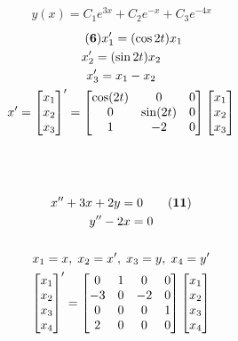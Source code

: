\documentclass{article}
\begin{document}
    \begin{gather*}
        y(x) = C_1e^{3x}+C_2e^{-x}+C_3e^{-4x}
    \end{gather*}
    \begin{gather*}\tag{\textbf{6}}
        x'_1 = (\cos2t)x_1\\
        x'_2 = (\sin2t)x_2\\
        x'_3 = x_1-x_2\\
        x' =
        \begin{bmatrix}
            x_1\\x_2\\x_3
        \end{bmatrix}'
        = 
        \begin{bmatrix}
            \cos(2t) & 0 & 0\\
            0 & \sin(2t) & 0\\
            1 & -2 & 0
        \end{bmatrix}
        \begin{bmatrix}
            x_1 \\ x_2 \\ x_3
        \end{bmatrix}
        \\\\\\\\
        x'' + 3x + 2y = 0 \tag{\textbf{11}}\\
        y'' - 2x = 0\\\\
        x_1 = x,\;x_2 = x',\;x_3 = y,\;x_4 = y'\\
        \begin{bmatrix}
            x_1\\x_2\\x_3\\x_4
        \end{bmatrix}'
        =
        \begin{bmatrix}
            0 & 1 & 0 & 0\\
            -3 & 0 & -2& 0\\
            0 & 0 & 0 & 1\\
            2 & 0 & 0 & 0
        \end{bmatrix}
        \begin{bmatrix}
            x_1 \\ x_2 \\ x_3 \\ x_4
        \end{bmatrix}
    \end{gather*}
\end{document}
